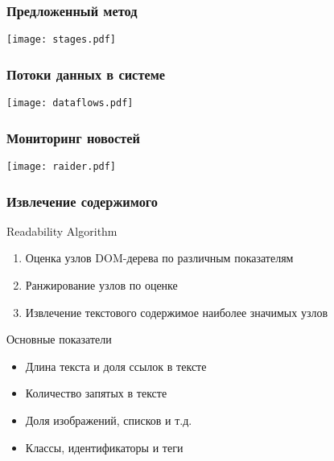 \documentclass[hyperref={unicode}, 14pt, aspectratio=169]{beamer}
\begin{document}
\begin{frame}
    \frametitle{Предложенный метод}

    \begin{center}
        \texttt{[image: stages.pdf]}
    \end{center}
\end{frame}

\begin{frame}
    \frametitle{Потоки данных в системе}

    \begin{center}
        \texttt{[image: dataflows.pdf]}
    \end{center}
\end{frame}

\begin{frame}
    \frametitle{Мониторинг новостей}

    \begin{center}
        \texttt{[image: raider.pdf]}
    \end{center}
\end{frame}

\begin{frame}
    \frametitle{Извлечение содержимого}

    \begin{block}{Readability Algorithm}
        \begin{enumerate}
            \item Оценка узлов DOM-дерева по различным показателям
            \item Ранжирование узлов по оценке
            \item Извлечение текстового содержимое наиболее значимых узлов
        \end{enumerate}
    \end{block}

    \begin{block}{Основные показатели}
        \begin{itemize}
            \item Длина текста и доля ссылок в тексте
            \item Количество запятых в тексте
            \item Доля изображений, списков и т.д.
            \item Классы, идентификаторы и теги
        \end{itemize}
    \end{block}
\end{frame}
\end{document}
